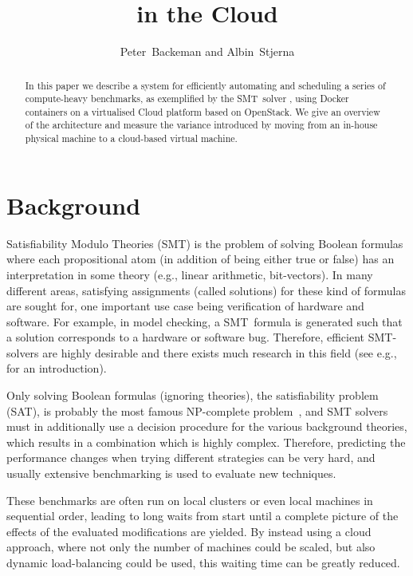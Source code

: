 \documentclass[a4paper]{IEEEtran}
\title{\uppsat{} in the Cloud}
\author{Peter~Backeman and Albin~Stjerna}
\begin{document}
\maketitle

\begin{abstract}
  In this paper we describe a system for efficiently automating and
  scheduling a series of compute-heavy benchmarks, as exemplified by
  the SMT~solver {\uppsat{}}, using Docker containers on a virtualised
  Cloud platform based on OpenStack. We give an overview of the
  architecture and measure the variance introduced by moving from an
  in-house physical machine to a cloud-based virtual machine.
\end{abstract}

\section{Background}

Satisfiability Modulo Theories (SMT) is the problem of solving Boolean
formulas where each propositional atom (in addition of being either
true or false) has an interpretation in some theory (e.g., linear
arithmetic, bit-vectors). In many different areas, satisfying
assignments (called solutions) for these kind of formulas are sought
for, one important use case being verification of hardware and
software. For example, in model checking, a SMT~formula is generated
such that a solution corresponds to a hardware or software
bug. Therefore, efficient SMT-solvers are highly desirable and there
exists much research in this field (see e.g.,~\cite{sathandbook} for
an introduction).

Only solving Boolean formulas (ignoring theories), the satisfiability
problem (SAT), is probably the most famous NP-complete
problem~\cite{satnp}, and SMT solvers must in additionally use a
decision procedure for the various background theories, which results
in a combination which is highly complex. Therefore, predicting the
performance changes when trying different strategies can be very hard,
and usually extensive benchmarking is used to evaluate new techniques.

These benchmarks are often run on local clusters or even local
machines in sequential order, leading to long waits from start until a
complete picture of the effects of the evaluated modifications are
yielded. By instead using a cloud approach, where not only the number
of machines could be scaled, but also dynamic load-balancing could be
used, this waiting time can be greatly reduced.
\end{document}
